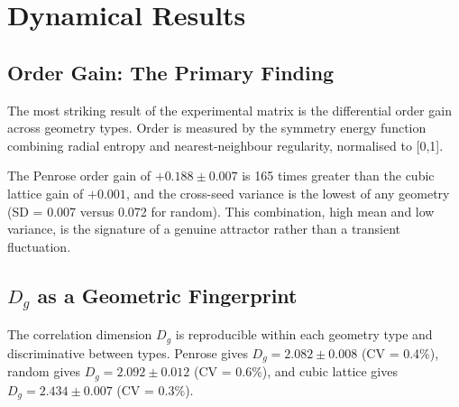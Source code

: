 \documentclass[11pt,a4paper]{article}
\begin{document}
\section{Dynamical Results}

\subsection{Order Gain: The Primary Finding}

The most striking result of the experimental matrix is the differential order gain across geometry types. Order is measured by the symmetry energy function combining radial entropy and nearest-neighbour regularity, normalised to [0,1].

\begin{table}[htbp]
\centering
{}
\caption{Summary statistics across all full-evolution runs (mean $\pm$ SD across seeds). Penrose results highlighted. All quantities computed from final simulation state.}
\end{table}

The Penrose order gain of $+0.188 \pm 0.007$ is 165 times greater than the cubic lattice gain of $+0.001$, and the cross-seed variance is the lowest of any geometry (SD = 0.007 versus 0.072 for random). This combination, high mean and low variance, is the signature of a genuine attractor rather than a transient fluctuation.

\subsection{$D_g$ as a Geometric Fingerprint}

The correlation dimension $D_g$ is reproducible within each geometry type and discriminative between types. Penrose gives $D_g = 2.082 \pm 0.008$ (CV = 0.4\%), random gives $D_g = 2.092 \pm 0.012$ (CV = 0.6\%), and cubic lattice gives $D_g = 2.434 \pm 0.007$ (CV = 0.3\%).
\end{document}
